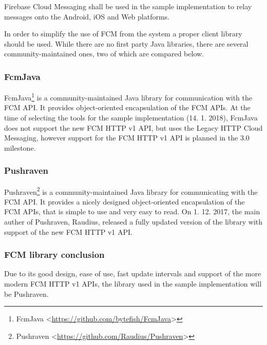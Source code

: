 Firebase Cloud Messaging shall be used in the sample implementation to relay messages onto the Android, iOS and Web platforms. 

In order to simplify the use of FCM from the system a proper client library should be used. While there are no first party Java libraries, there are several community-maintained ones, two of which are compared below.

\subsubsection{FcmJava}
FcmJava\footnote{FcmJava <\url{https://github.com/bytefish/FcmJava}>} is a community-maintained Java library for communication with the FCM API. It provides object-oriented encapsulation of the FCM APIs. At the time of selecting the tools for the sample implementation (14. 1. 2018), FcmJava does not support the new FCM HTTP v1 API, but uses the Legacy HTTP Cloud Messaging, however support for the FCM HTTP v1 API is planned in the 3.0 milestone\cite{fcmJava}.

\subsubsection{Pushraven}
Pushraven\footnote{Pushraven <\url{https://github.com/Raudius/Pushraven}>} is a community-maintained Java library for communicating with the FCM API. It provides a nicely designed object-oriented encapsulation of the FCM APIs, that is simple to use and very easy to read. On 1. 12. 2017, the main auther of Pushraven, Raudius, released a fully updated version of the library with support of the new FCM HTTP v1 API\cite{pushraven-new-api}.

\subsubsection*{FCM library conclusion}
Due to its good design, ease of use, fast update intervals and support of the more modern FCM HTTP v1 APIs, the library used in the sample implementation will be Pushraven.
